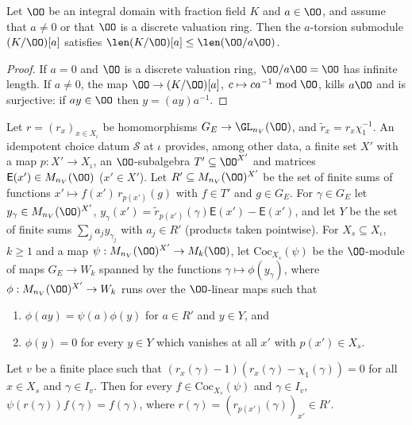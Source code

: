 \begin{lemma}\label{pf:linkN:torsKO}
Let $\OO$ be an integral domain with fraction field $K$ and $a\in\OO$, and assume that $a\ne0$ or that $\OO$ is a discrete valuation ring. Then
the $a$-torsion submodule $(K/\OO)[a]$ satisfies $\len(K/\OO)[a]\le\len(\OO/a\OO)$.
\end{lemma}

\begin{proof}
If $a=0$ and $\OO$ is a discrete valuation ring, $\OO/a\OO=\OO$ has infinite length. If $a\ne0$, the map $\OO\to(K/\OO)[a]$,
$c\mapsto ca^{-1}\bmod\OO$, kills $a\OO$ and is surjective: if $ay\in\OO$ then $y=(ay)a^{-1}$.
\end{proof}

\begin{definition}\label{pf:linkN:cocW}
Let $r=(r_x)_{x\in X_\iota}$ be homomorphisms $G_E\to\GL_{n_V}(\OO)$, and $\tilde r_x=r_x\chi_1^{-1}$. An idempotent choice datum $\mathcal S$ at $\iota$
provides, among other data, a finite set $X'$ with a map $p:X'\to X_\iota$, an $\OO$-subalgebra $T'\subseteq\OO^{X'}$ and matrices
$\mathsf E(x')\in M_{n_V}(\OO)$ ($x'\in X'$). Let $R'\subseteq M_{n_V}(\OO)^{X'}$ be the set of finite sums of functions
$x'\mapsto f(x')\,r_{p(x')}(g)$ with $f\in T'$ and $g\in G_E$. For $\gamma\in G_E$ let $y_\gamma\in M_{n_V}(\OO)^{X'}$,
$y_\gamma(x')=\tilde r_{p(x')}(\gamma)\mathsf E(x')-\mathsf E(x')$, and let $Y$ be the set of finite sums $\sum_ja_jy_{\gamma_j}$ with $a_j\in R'$
(products taken pointwise). For $X_s\subseteq X_\iota$, $k\ge1$ and a map $\psi:M_{n_V}(\OO)^{X'}\to M_k(\OO)$, let $\mathrm{Coc}_{X_s}(\psi)$ be the
$\OO$-module of maps $G_E\to W_k$ spanned by the functions $\gamma\mapsto\phi(y_\gamma)$, where $\phi:M_{n_V}(\OO)^{X'}\to W_k$ runs over the
$\OO$-linear maps such that
\begin{enumerate}[label=(\alph*)]
\item $\phi(ay)=\psi(a)\phi(y)$ for $a\in R'$ and $y\in Y$, and
\item $\phi(y)=0$ for every $y\in Y$ which vanishes at all $x'$ with $p(x')\in X_s$.
\end{enumerate}
\end{definition}

\begin{lemma}\label{pf:linkN:cocquad}
Let $v$ be a finite place such that $(r_x(\gamma)-1)(r_x(\gamma)-\chi_1(\gamma))=0$ for all $x\in X_s$ and $\gamma\in I_v$. Then for every
$f\in\mathrm{Coc}_{X_s}(\psi)$ and $\gamma\in I_v$, $\psi(r(\gamma))f(\gamma)=f(\gamma)$, where $r(\gamma)=(r_{p(x')}(\gamma))_{x'}\in R'$.
\end{lemma}

